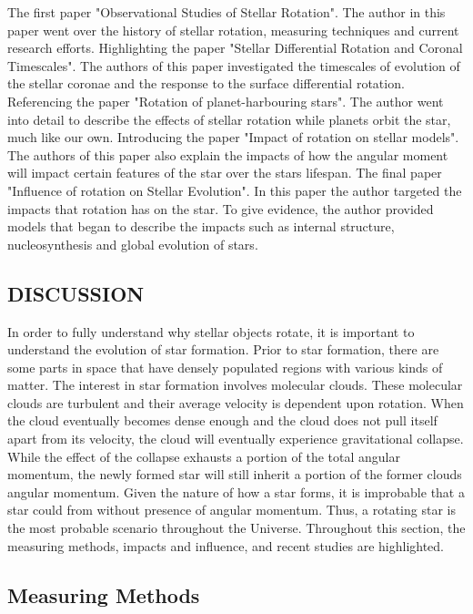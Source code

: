 \documentclass[a4paper, 12pt]{article}
\begin{document}
The first paper "Observational Studies of Stellar Rotation". The author in this paper went over the history of stellar rotation, measuring techniques and current research efforts. Highlighting the paper "Stellar Differential Rotation and Coronal Timescales". The authors of this paper investigated the timescales of evolution of the stellar coronae and the response to the surface differential rotation. Referencing the paper "Rotation of planet-harbouring stars". The author went into detail to describe the effects of stellar rotation while planets orbit the star, much like our own. Introducing the paper "Impact of rotation on stellar models". The authors of this paper also explain the impacts of how the angular moment will impact certain features of the star over the stars lifespan. The final paper "Influence of rotation on Stellar Evolution". In this paper the author targeted the impacts that rotation has on the star. To give evidence, the author provided models that began to describe the impacts such as internal structure, nucleosynthesis and global evolution of stars.

\begin{center}
\section{DISCUSSION}
\end{center}

In order to fully understand why stellar objects rotate, it is important to understand the evolution of star formation. Prior to star formation, there are some parts in space that have densely populated regions with various kinds of matter. The interest in star formation involves molecular clouds. These molecular clouds are turbulent and their average velocity is dependent upon rotation. When the cloud eventually becomes dense enough and the cloud does not pull itself apart from its velocity, the cloud will eventually experience gravitational collapse. While the effect of the collapse exhausts a portion of the total angular momentum, the newly formed star will still inherit a portion of the former clouds angular momentum. Given the nature of how a star forms, it is improbable that a star could from without presence of angular momentum. Thus, a rotating star is the most probable scenario throughout the Universe. Throughout this section, the measuring methods, impacts and influence, and recent studies are highlighted.

\subsection{Measuring Methods}
\end{document}

